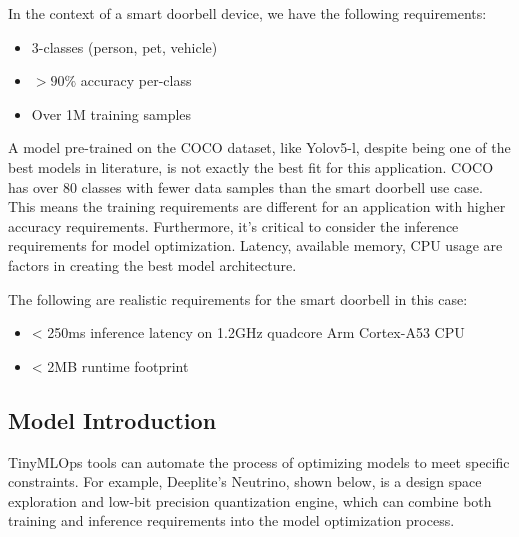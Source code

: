 {{{{{    In the context of a smart doorbell device, we have the following requirements:
    
    \begin{itemize}
      \item 3-classes (person, pet, vehicle)
      \item $>90\%$ accuracy per-class
      \item Over 1M training samples
    \end{itemize}

    A model pre-trained on the COCO dataset, like Yolov5-l, despite being one of the best models in literature, is not exactly the best fit for this application. COCO has over 80 classes with fewer data samples than the smart doorbell use case. This means the training requirements are different for an application with higher accuracy requirements. Furthermore, it’s critical to consider the inference requirements for model optimization. Latency, available memory, CPU usage are factors in creating the best model architecture. 
    
    The following are realistic requirements for the smart doorbell in this case:
    
    \begin{itemize}
      \item < 250ms inference latency on 1.2GHz quadcore Arm Cortex-A53 CPU
      \item < 2MB runtime footprint
    \end{itemize}
    
    \subsection{Model Introduction}
    
    TinyMLOps tools can automate the process of optimizing models to meet specific constraints. For example, Deeplite’s Neutrino, shown below, is a design space exploration and low-bit precision quantization engine, which can combine both training and inference requirements into the model optimization process.
    
    
}}}}}
